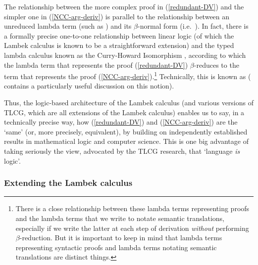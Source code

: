 \documentclass[output=paper]{langsci/langscibook}
\begin{document}
The relationship between the more complex proof in (\ref{redundant-DV}) and
the simpler one in (\ref{NCC-arg-deriv}) is parallel to the relationship
between an unreduced lambda term (such as
)
and its
$\beta$-normal form (i.e.\  ).
In fact, there is a formally precise
one-to-one relationship between linear logic (of which the Lambek calculus is known
to be a straightforward extension) and the typed lambda calculus known
as the Curry-Howard Isomorphism \citep{howard1969}, according to which
the lambda term that represents the proof 
(\ref{redundant-DV}) $\beta$-reduces  to the term that represents the proof
(\ref{NCC-arg-deriv}).\footnote{There is a close relationship between these
lambda terms representing proofs and the lambda  terms that we write
to notate semantic translations, especially if we write the latter
at each step of derivation \emph{without} performing $\beta$-reduction. But
it is important to keep in mind that
lambda terms representing syntactic proofs
and lambda terms notating semantic translations are distinct things.}
Technically, this is known as 
(\citet{jaeger05} contains a particularly useful discussion on this notion). 

Thus, the logic-based architecture of the Lambek calculus (and various versions of
TLCG, which are all extensions of the Lambek calculus) enables us to say, in a
technically precise way, how (\ref{redundant-DV}) and (\ref{NCC-arg-deriv}) are
the `same' (or, more precisely, equivalent), by building on
independently established results in mathematical logic and computer
science. This is one big advantage of taking seriously the view,
advocated by the TLCG research, that `language \emph{is} logic'.


\subsubsection{Extending the Lambek calculus \label{sec:extending}}
\end{document}
